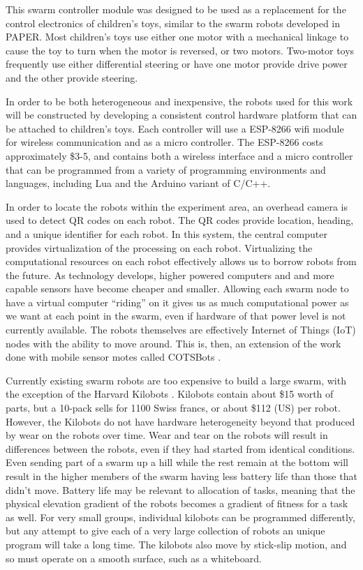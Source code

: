\documentclass[]{article}
\begin{document}
This swarm controller module was designed to be used as a replacement for the control electronics of children's toys, similar to the  swarm robots developed in PAPER. 
Most children's toys use either one motor with a mechanical linkage to cause the toy to turn when the motor is reversed, or two motors.
Two-motor toys frequently use either differential steering or have one motor provide drive power and the other provide steering. 

In order to be both heterogeneous and inexpensive, the robots used for this work will be constructed by developing a consistent control hardware platform that can be attached to children's toys. 
Each controller will use a ESP-8266 wifi module for wireless communication and as a micro controller. 
The ESP-8266 costs approximately \$3-5, and contains both a wireless interface and a micro controller that can be programmed from a variety of programming environments and languages, including Lua and the Arduino variant of C/C++. 

In order to locate the robots within the experiment area, an overhead camera is used to detect QR codes on each robot. 
The QR codes provide location, heading, and a unique identifier for each robot. 
In this system, the central computer provides virtualization of the processing on each robot. 
Virtualizing the computational resources on each robot effectively allows us to borrow robots from the future. 
As technology develops, higher powered computers and and more capable sensors have become cheaper and smaller. 
Allowing each swarm node to have a virtual computer ``riding'' on it gives us as much computational power as we want at each point in the swarm, even if hardware of that power level is not currently available.
The robots themselves are effectively Internet of Things (IoT) nodes with the ability to move around. 
This is, then, an extension of the work done with mobile sensor motes called COTSBots \cite{bergbreiter2003cotsbots}.

Currently existing swarm robots are too expensive to build a large swarm, with the exception of the Harvard Kilobots \cite{rubenstein2014kilobot}. 
Kilobots contain about \$15 worth of parts, but a 10-pack sells for 1100 Swiss francs, or about \$112 (US) per robot. 
However, the Kilobots do not have hardware heterogeneity beyond that produced by wear on the robots over time. 
Wear and tear on the robots will result in differences between the robots, even if they had started from identical conditions. 
Even sending part of a swarm up a hill while the rest remain at the bottom will result in the higher members of the swarm having less battery life than those that didn't move. 
Battery life may be relevant to allocation of tasks, meaning that the physical elevation gradient of the robots becomes a gradient of fitness for a task as well. 
For very small groups, individual kilobots can be programmed differently, but any attempt to give each of a very large collection of robots an unique program will take a long time. 
The kilobots also move by stick-slip motion, and so must operate on a smooth surface, such as a whiteboard. 
\end{document}
